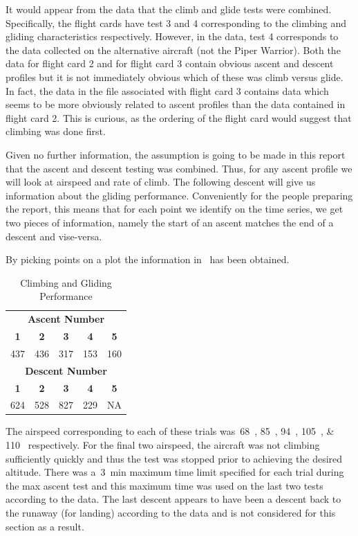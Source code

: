 \documentclass[conf]{new-aiaa}
\begin{document}
It would appear from the data that the climb and glide tests were combined. Specifically, the flight cards have test 3 and 4 corresponding to the climbing and gliding characteristics respectively. However, in the data, test 4 corresponds to the data collected on the alternative aircraft (not the Piper Warrior). Both the data for flight card 2 and for flight card 3 contain obvious ascent and descent profiles but it is not immediately obvious which of these was climb versus glide. In fact, the data in the file associated with flight card 3 contains data which seems to be more obviously related to ascent profiles than the data contained in flight card 2. This is curious, as the ordering of the flight card would suggest that climbing was done first.

Given no further information, the assumption is going to be made in this report that the ascent and descent testing was combined. Thus, for any ascent profile we will look at airspeed and rate of climb. The following descent will give us information about the gliding performance. Conveniently for the people preparing the report, this means that for each point we identify on the time series, we get two pieces of information, namely the start of an ascent matches the end of a descent and vise-versa.

By picking points on a plot the information in~ has been obtained.

\begin{table}[htp!]
\centering
\caption{Climbing and Gliding Performance}
\label{climbglide}
\begin{tabular}{ c | c | c | c | c }
	\multicolumn{5}{c}{\textbf{Ascent Number}}										\\
	\textbf{1} & \textbf{2} & \textbf{3} & \textbf{4}	& \textbf{5}								\\
	\hline
	\SI{437}{\fpm} & \SI{436}{\foot} & \SI{317}{\foot} & \SI{153}{\foot} & \SI{160}{\fpm}		\\
	\hline
	\multicolumn{5}{c}{\textbf{Descent Number}}										\\
	\textbf{1} & \textbf{2} & \textbf{3} & \textbf{4}	& \textbf{5}						\\
	\hline
	\SI{624}{\fpm} & \SI{528}{\foot} & \SI{827}{\foot} & \SI{229}{\foot}  & NA		\\
\end{tabular}
\end{table}

The airspeed corresponding to each of these trials was~\SIlist{68;85;94;105;110}{\kts} respectively. For the final two airspeed, the aircraft was not climbing sufficiently quickly and thus the test was stopped prior to achieving the desired altitude. There was a~\SI{3}{\minute} maximum time limit specified for each trial during the max ascent test and this maximum time was used on the last two tests according to the data. The last descent appears to have been a descent back to the runaway (for landing) according to the data and is not considered for this section as a result.
\end{document}
